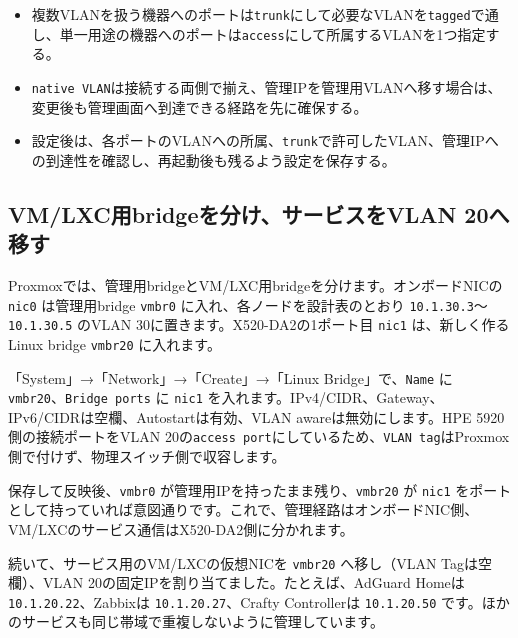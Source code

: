 
\begin{itemize}
\item 複数VLANを扱う機器へのポートは\texttt{trunk}にして必要なVLANを\texttt{tagged}で通し、単一用途の機器へのポートは\texttt{access}にして所属するVLANを1つ指定する。
\item \texttt{native VLAN}は接続する両側で揃え、管理IPを管理用VLANへ移す場合は、変更後も管理画面へ到達できる経路を先に確保する。
\item 設定後は、各ポートのVLANへの所属、\texttt{trunk}で許可したVLAN、管理IPへの到達性を確認し、再起動後も残るよう設定を保存する。
\end{itemize}

\subsection{VM/LXC用bridgeを分け、サービスをVLAN 20へ移す}

Proxmoxでは、管理用bridgeとVM/LXC用bridgeを分けます。オンボードNICの \texttt{nic0} は管理用bridge \texttt{vmbr0} に入れ、各ノードを設計表のとおり \texttt{10.1.30.3}〜\texttt{10.1.30.5} のVLAN 30に置きます。X520-DA2の1ポート目 \texttt{nic1} は、新しく作るLinux bridge \texttt{vmbr20} に入れます。

「System」→「Network」→「Create」→「Linux Bridge」で、\texttt{Name} に \texttt{vmbr20}、\texttt{Bridge ports} に \texttt{nic1} を入れます。IPv4/CIDR、Gateway、IPv6/CIDRは空欄、Autostartは有効、VLAN awareは無効にします。HPE 5920側の接続ポートをVLAN 20の\texttt{access port}にしているため、\texttt{VLAN tag}はProxmox側で付けず、物理スイッチ側で収容します。


保存して反映後、\texttt{vmbr0} が管理用IPを持ったまま残り、\texttt{vmbr20} が \texttt{nic1} をポートとして持っていれば意図通りです。これで、管理経路はオンボードNIC側、VM/LXCのサービス通信はX520-DA2側に分かれます。

続いて、サービス用のVM/LXCの仮想NICを \texttt{vmbr20} へ移し（VLAN Tagは空欄）、VLAN 20の固定IPを割り当てました。たとえば、AdGuard Homeは \texttt{10.1.20.22}、Zabbixは \texttt{10.1.20.27}、Crafty Controllerは \texttt{10.1.20.50} です。ほかのサービスも同じ帯域で重複しないように管理しています。

